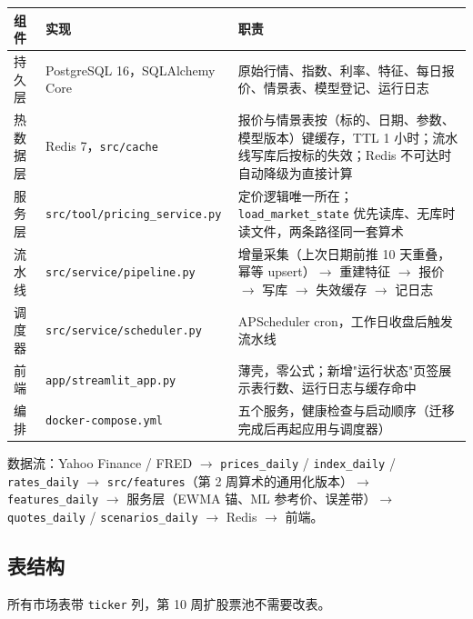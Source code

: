 \documentclass[11pt]{ctexart}
\begin{document}
\begin{center}\small
\begin{tabular}{p{1.9cm}p{4.6cm}p{8.6cm}}
\toprule
组件 & 实现 & 职责 \\
\midrule
持久层 & PostgreSQL 16，SQLAlchemy Core & 原始行情、指数、利率、特征、每日报价、情景表、模型登记、运行日志 \\
热数据层 & Redis 7，\texttt{src/cache} & 报价与情景表按（标的、日期、参数、模型版本）键缓存，TTL 1 小时；流水线写库后按标的失效；Redis 不可达时自动降级为直接计算 \\
服务层 & \texttt{src/tool/}\newline\texttt{pricing\_service.py} & 定价逻辑唯一所在；\texttt{load\_market\_state} 优先读库、无库时读文件，两条路径同一套算术 \\
流水线 & \texttt{src/service/pipeline.py} & 增量采集（上次日期前推 10 天重叠，幂等 upsert）$\to$ 重建特征 $\to$ 报价 $\to$ 写库 $\to$ 失效缓存 $\to$ 记日志 \\
调度器 & \texttt{src/service/scheduler.py} & APScheduler cron，工作日收盘后触发流水线 \\
前端 & \texttt{app/streamlit\_app.py} & 薄壳，零公式；新增"运行状态"页签展示表行数、运行日志与缓存命中 \\
编排 & \texttt{docker-compose.yml} & 五个服务，健康检查与启动顺序（迁移完成后再起应用与调度器） \\
\bottomrule
\end{tabular}
\end{center}

数据流：Yahoo Finance / FRED $\to$ \texttt{prices\_daily} / \texttt{index\_daily} / \texttt{rates\_daily} $\to$ \texttt{src/features}（第 2 周算术的通用化版本）$\to$ \texttt{features\_daily} $\to$ 服务层（EWMA 锚、ML 参考价、误差带）$\to$ \texttt{quotes\_daily} / \texttt{scenarios\_daily} $\to$ Redis $\to$ 前端。

\subsection{表结构}

所有市场表带 \texttt{ticker} 列，第 10 周扩股票池不需要改表。
\end{document}

